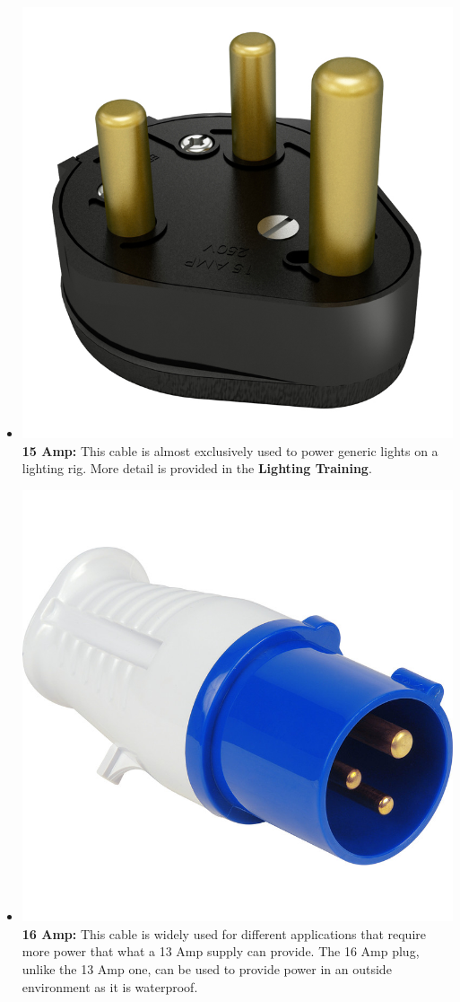 \documentclass[14pt]{article} %
\begin{document}
\begin{itemize}
\item \includegraphics[scale=0.15]{15amp.jpg}\textbf{15 Amp:} This cable is almost exclusively used to power generic lights on a lighting rig. More detail is provided in the \textbf{Lighting Training}. 

\item \includegraphics[scale=0.16]{16amp.jpg}\textbf{16 Amp:} This cable is widely used for different applications that require more power that what a 13 Amp supply can provide. The 16 Amp plug, unlike the 13 Amp one, can be used to provide power in an outside environment as it is waterproof. 


\end{itemize}
\end{document}
